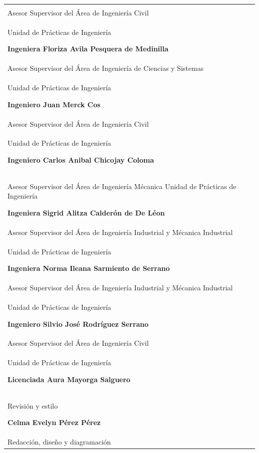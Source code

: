 \documentclass[12pt,spanish,Letterpaper,openany]{book}
\newcommand{\spacefourmilis}{\vspace{4mm}}
\begin{document}
\begin{longtable}[l]{@{}ll@{}}\endhead\begin{minipage}[t]{0.47\columnwidth}\raggedright

\hypertarget{comite-editorial}{%
\section*{Comité Editorial}\label{comite-editorial}}
\addcontentsline{toc}{section}{Comité Editorial}

\textbf{Ingeniero Oscar Argueta Hernández}\\
Asesor Supervisor del Área de Ingeniería Civil\\
Unidad de Prácticas de Ingeniería
\spacefourmilis

\textbf{Ingeniera Floriza Avila Pesquera de Medinilla}\\
Asesor Supervisor del Área de Ingeniería de Ciencias y Sistemas\\
Unidad de Prácticas de Ingeniería
\spacefourmilis

\textbf{Ingeniero Juan Merck Cos}\\
Asesor Supervisor del Área de Ingeniería Civil\\
Unidad de Prácticas de Ingeniería
\spacefourmilis

\textbf{Ingeniero Carlos Anibal Chicojay Coloma}\\
Asesor Supervisor del Área de Ingeniería Mécanica
Unidad de Prácticas de Ingeniería
\spacefourmilis

\textbf{Ingeniera Sigrid Alitza Calderón de De Léon}\\
Asesor Supervisor del Área de Ingeniería Industrial y Mécanica Industrial\\
Unidad de Prácticas de Ingeniería
\spacefourmilis

\textbf{Ingeniera Norma Ileana Sarmiento de Serrano}\\
Asesor Supervisor del Área de Ingeniería Industrial y Mécanica Industrial\\
Unidad de Prácticas de Ingeniería
\spacefourmilis

\textbf{Ingeniero Silvio José Rodríguez Serrano}\\
Asesor Supervisor del Área de Ingeniería Civil\\
Unidad de Prácticas de Ingeniería
\spacefourmilis

\textbf{Licenciada Aura Mayorga Salguero}\\
Revisión y estilo
\spacefourmilis

\textbf{Celma Evelyn Pérez Pérez}\\
Redacción, diseño y diagramación
\spacefourmilis

\end{minipage}\end{longtable}
\end{document}
